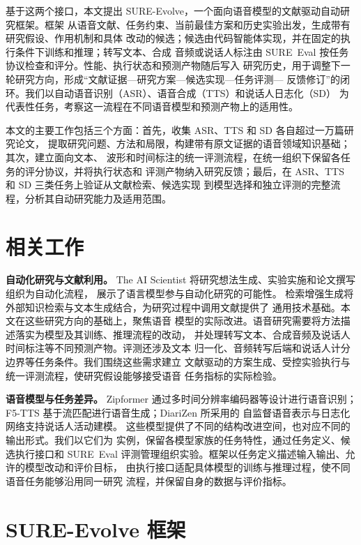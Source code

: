 \documentclass{article}
\begin{document}
基于这两个接口，本文提出 SURE-Evolve，一个面向语音模型的文献驱动自动研究框架。框架
从语音文献、任务约束、当前最佳方案和历史实验出发，生成带有研究假设、作用机制和具体
改动的候选；候选由代码智能体实现，并在固定的执行条件下训练和推理；转写文本、合成
音频或说话人标注由 SURE~Eval 按任务协议检查和评分。性能、执行状态和预测产物随后写入
研究历史，用于调整下一轮研究方向，形成“文献证据—研究方案—候选实现—任务评测—
反馈修订”的闭环。我们以自动语音识别（ASR）、语音合成（TTS）和说话人日志化（SD）
为代表性任务，考察这一流程在不同语音模型和预测产物上的适用性。

本文的主要工作包括三个方面：首先，收集 ASR、TTS 和 SD 各自超过一万篇研究论文，
提取研究问题、方法和局限，构建带有原文证据的语音领域知识基础；其次，建立面向文本、
波形和时间标注的统一评测流程，在统一组织下保留各任务的评分协议，并将执行状态和
评测产物纳入研究反馈；最后，在 ASR、TTS 和 SD 三类任务上验证从文献检索、候选实现
到模型选择和独立评测的完整流程，分析其自动研究能力及适用范围。

\section{相关工作}
\label{sec:related}

\textbf{自动化研究与文献利用。}
The AI Scientist 将研究想法生成、实验实施和论文撰写组织为自动化流程，
展示了语言模型参与自动化研究的可能性\citep{lu2024aiscientist}。
检索增强生成将外部知识检索与文本生成结合，为研究过程中调用文献提供了
通用技术基础\citep{lewis2020rag}。本文在这些研究方向的基础上，聚焦语音
模型的实际改进。语音研究需要将方法描述落实为模型及其训练、推理流程的改动，
并处理转写文本、合成音频及说话人时间标注等不同预测产物。评测还涉及文本
归一化、音频转写后端和说话人计分边界等任务条件。我们围绕这些需求建立
文献驱动的方案生成、受控实验执行与统一评测流程，使研究假设能够接受语音
任务指标的实际检验。

\textbf{语音模型与任务差异。}
Zipformer 通过多时间分辨率编码器等设计进行语音识别\citep{yao2024zipformer}；
F5-TTS 基于流匹配进行语音生成\citep{chen2024f5tts}；DiariZen 所采用的
自监督语音表示与日志化网络支持说话人活动建模\citep{han2025leveraging}。
这些模型提供了不同的结构改进空间，也对应不同的输出形式。我们以它们为
实例，保留各模型家族的任务特性，通过任务定义、候选执行接口和 SURE~Eval
评测管理组织实验。框架以任务定义描述输入输出、允许的模型改动和评价目标，
由执行接口适配具体模型的训练与推理过程，使不同语音任务能够沿用同一研究
流程，并保留自身的数据与评价指标。

\section{SURE-Evolve 框架}
\label{sec:method}
\end{document}

